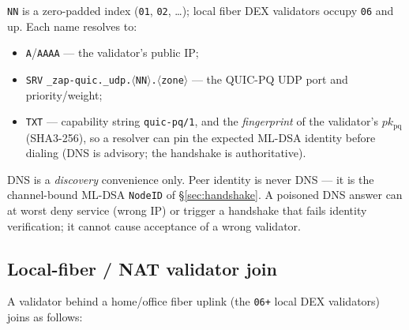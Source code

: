 \documentclass[11pt,a4paper]{article}
\newcommand{\code}[1]{\texttt{#1}}
\begin{document}
\code{NN} is a zero-padded index (\code{01}, \code{02}, \dots); local
fiber DEX validators occupy \code{06} and up. Each name resolves to:

\begin{itemize}[nosep]
  \item \code{A}/\code{AAAA} --- the validator's public IP;
  \item \code{SRV} \code{\_zap-quic.\_udp.$\langle$NN$\rangle$.$\langle$zone$\rangle$}
        --- the QUIC-PQ UDP port and priority/weight;
  \item \code{TXT} --- capability string \code{quic-pq/1}, and the
        \emph{fingerprint} of the validator's $pk_{\mathrm{pq}}$
        (SHA3-256), so a resolver can pin the expected ML-DSA identity
        before dialing (DNS is advisory; the handshake is authoritative).
\end{itemize}

DNS is a \emph{discovery} convenience only. Peer identity is never DNS
--- it is the channel-bound ML-DSA \code{NodeID} of \S\ref{sec:handshake}.
A poisoned DNS answer can at worst deny service (wrong IP) or trigger a
handshake that fails identity verification; it cannot cause acceptance of
a wrong validator.

\subsection{Local-fiber / NAT validator join}\label{sec:join}

A validator behind a home/office fiber uplink (the \code{06+} local DEX
validators) joins as follows:
\end{document}
